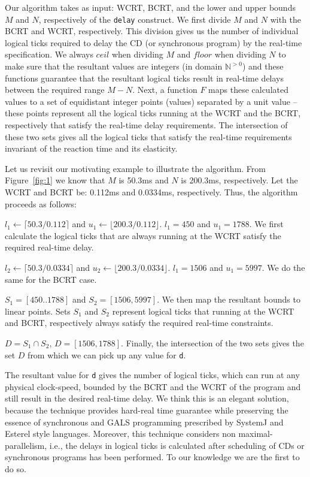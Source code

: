 Our algorithm takes as input: WCRT, BCRT, and the lower and upper bounds
$M$ and $N$, respectively of the \texttt{delay} construct. We first
divide $M$ and $N$ with the BCRT and WCRT, respectively. This division
gives us the number of individual logical ticks required to delay the CD
(or synchronous program) by the real-time specification. We always
$ceil$ when dividing $M$ and $floor$ when dividing $N$ to make sure that
the resultant values are integers (in domain $\mathbb{N}^{>0}$) and
these functions guarantee that the resultant logical ticks result in
real-time delays between the required range $M-N$. Next, a function $F$
maps these calculated values to a set of equidistant integer points
(values) separated by a unit value -- these points represent all the
logical ticks running at the WCRT and the BCRT, respectively that
satisfy the real-time delay requirements. The intersection of these two
sets gives all the logical ticks that satisfy the real-time requirements
invariant of the reaction time and its elasticity.

Let us revisit our motivating example to illustrate the algorithm. From
Figure~\ref{fig:1} we know that $M$ is 50.3ms and $N$ is 200.3ms,
respectively. Let the WCRT and BCRT be: 0.112ms and 0.0334ms,
respectively. Thus, the algorithm proceeds as follows:

\begin{enumerate*}
\item $l_1 \leftarrow \lceil 50.3/0.112 \rceil$ and $u_1 \leftarrow
  \lfloor 200.3/0.112 \rfloor$. $l_1 = 450$ and $u_1 = 1788$. We first
  calculate the logical ticks that are always running at the WCRT
  satisfy the required real-time delay.
\item $l_2 \leftarrow \lceil 50.3/0.0334 \rceil$ and $u_2 \leftarrow
  \lfloor 200.3/0.0334 \rfloor$. $l_1 = 1506$ and $u_1 = 5997$. We do
  the same for the BCRT case.
\item $S_1 = [450..1788]$ and $S_2 =[1506,5997]$. We then map the
  resultant bounds to linear points. Sets $S_1$ and $S_2$ represent
  logical ticks that running at the WCRT and BCRT, respectively always
  satisfy the required real-time constraints.
\item $D = S_1 \cap S_2$, $D = [1506,1788]$. Finally, the intersection
  of the two sets gives the set $D$ from which we can pick up any value
  for \texttt{d}.
\end{enumerate*}

The resultant value for \texttt{d} gives the number of logical ticks,
which can run at any physical clock-speed, bounded by the BCRT and the
WCRT of the program and still result in the desired real-time delay. We
think this is an elegant solution, because the technique provides
hard-real time guarantee while preserving the essence of synchronous and
GALS programming prescribed by SystemJ and Esterel style
languages. Moreover, this technique considers non maximal-parallelism,
i.e., the delays in logical ticks is calculated after scheduling of CDs
or synchronous programs has been performed. To our knowledge we are the
first to do so.


